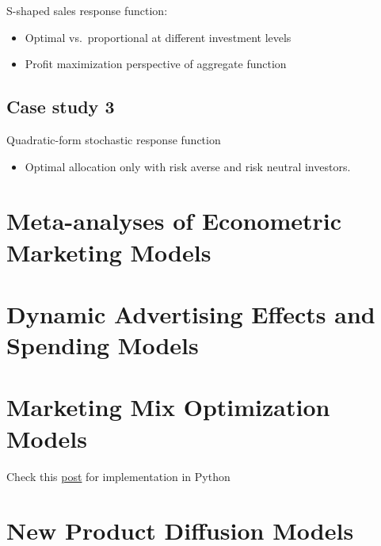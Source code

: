 \documentclass[
]{book}
\providecommand{\tightlist}{%
  \setlength{\itemsep}{0pt}\setlength{\parskip}{0pt}}
\begin{document}
S-shaped sales response function:

\begin{itemize}
\tightlist
\item
  Optimal vs.~proportional at different investment levels
\item
  Profit maximization perspective of aggregate function
\end{itemize}

\hypertarget{case-study-3}{%
\subsection{Case study 3}\label{case-study-3}}

Quadratic-form stochastic response function

\begin{itemize}
\tightlist
\item
  Optimal allocation only with risk averse and risk neutral investors.
\end{itemize}

\hypertarget{meta-analyses-of-econometric-marketing-models}{%
\section{Meta-analyses of Econometric Marketing Models}\label{meta-analyses-of-econometric-marketing-models}}

\hypertarget{dynamic-advertising-effects-and-spending-models}{%
\section{Dynamic Advertising Effects and Spending Models}\label{dynamic-advertising-effects-and-spending-models}}

\hypertarget{marketing-mix-optimization-models}{%
\section{Marketing Mix Optimization Models}\label{marketing-mix-optimization-models}}

Check this
\href{https://towardsdatascience.com/carryover-and-shape-effects-in-media-mix-modeling-paper-review-fd699b509e2d}{post} for
implementation in Python

\hypertarget{new-product-diffusion-models}{%
\section{New Product Diffusion Models}\label{new-product-diffusion-models}}
\end{document}
